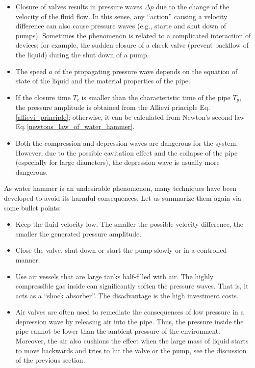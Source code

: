 \begin{itemize}
\item Closure of valves results in pressure waves $\Delta p$ due to the change of the velocity of the fluid flow. In this sense, any ``action'' causing a velocity difference can also cause pressure waves (e.g., starte and shut down of pumps). Sometimes the phenomenon is related to a complicated interaction of devices; for example, the sudden closure of a check valve (prevent backflow of the liquid) during the shut down of a pump. 
\item The speed $a$ of the propagating pressure wave depends on the equation of state of the liquid and the material properties of the pipe.
\item If the closure time $T_c$ is smaller than the characteristic time of the pipe $T_p$, the pressure amplitude is obtained from the Allievi principle Eq.\,\eqref{allievi_principle}; otherwise, it can be calculated from Newton's second law Eq.\,\eqref{newtons_law_of_water_hammer}.
\item Both the compression and depression waves are dangerous for the system. However, due to the possible cavitation effect and the collapse of the pipe (especially for large diameters), the depression wave is usually more dangerous.
\end{itemize}

As water hammer is an undesirable phenomenon, many techniques have been developed to avoid its harmful consequences. Let us summarize them again via some bullet points:

\begin{itemize}
\item Keep the fluid velocity low. The smaller the possible velocity difference, the smaller the generated pressure amplitude. 
\item Close the valve, shut down or start the pump slowly or in a controlled manner.
\item Use air vessels that are large tanks half-filled with air. The highly compressible gas inside can significantly soften the pressure waves. That is, it acts as a ``shock absorber''. The disadvantage is the high investment costs.
\item Air valves are often used to remediate the consequences of low pressure in a depression wave by releasing air into the pipe. Thus, the pressure inside the pipe cannot be lower than the ambient pressure of the environment. Moreover, the air also cushions the effect when the large mass of liquid starts to move backwards and tries to hit the valve or the pump, see the discussion of the previous section.
\end{itemize}



\clearpage